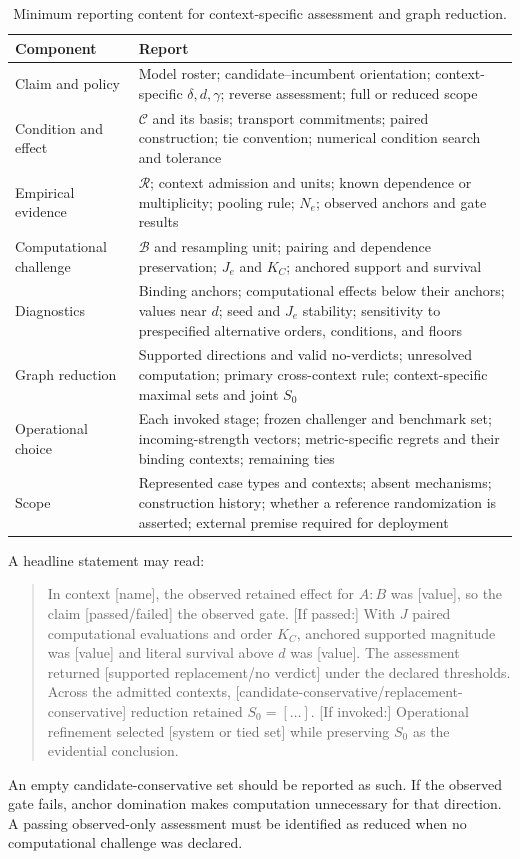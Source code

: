 \documentclass[11pt]{article}
\newcommand{\Regime}{\mathcal{R}}
\newcommand{\CSet}{\mathcal{C}}
\newcommand{\Boot}{\mathcal{B}}
\theoremstyle{remark}
\begin{document}
\begin{table}[!t]
\centering
\caption{Minimum reporting content for context-specific assessment and graph reduction.}
\label{tab:reporting}
\begin{tabularx}{\textwidth}{@{}>{\raggedright\arraybackslash}p{}>{\raggedright\arraybackslash}X@{}}
\toprule
Component & Report \\
\midrule
Claim and policy & Model roster; candidate--incumbent orientation; context-specific $\delta,d,\gamma$; reverse assessment; full or reduced scope \\
Condition and effect & $\CSet$ and its basis; transport commitments; paired construction; tie convention; numerical condition search and tolerance \\
Empirical evidence & $\Regime$; context admission and units; known dependence or multiplicity; pooling rule; $N_e$; observed anchors and gate results \\
Computational challenge & $\Boot$ and resampling unit; pairing and dependence preservation; $J_e$ and $K_C$; anchored support and survival \\
Diagnostics & Binding anchors; computational effects below their anchors; values near $d$; seed and $J_e$ stability; sensitivity to prespecified alternative orders, conditions, and floors \\
Graph reduction & Supported directions and valid no-verdicts; unresolved computation; primary cross-context rule; context-specific maximal sets and joint $S_0$ \\
Operational choice & Each invoked stage; frozen challenger and benchmark set; incoming-strength vectors; metric-specific regrets and their binding contexts; remaining ties \\
Scope & Represented case types and contexts; absent mechanisms; construction history; whether a reference randomization is asserted; external premise required for deployment \\
\bottomrule
\end{tabularx}
\end{table}

A headline statement may read:
\begin{quote}
In context [name], the observed retained effect for $A:B$ was [value], so the
claim [passed/failed] the observed gate. [If passed:] With $J$ paired
computational evaluations and order $K_C$, anchored supported magnitude was
[value] and literal survival above $d$ was [value]. The assessment returned
[supported replacement/no verdict] under the declared thresholds. Across the
admitted contexts, [candidate-conservative/replacement-conservative] reduction
retained $S_0=[\ldots]$. [If invoked:] Operational refinement selected
[system or tied set] while preserving $S_0$ as the evidential conclusion.
\end{quote}
An empty candidate-conservative set should be reported as such. If the
observed gate fails, anchor domination makes computation unnecessary for that
direction. A passing observed-only assessment must be identified as reduced
when no computational challenge was declared.
\end{document}
